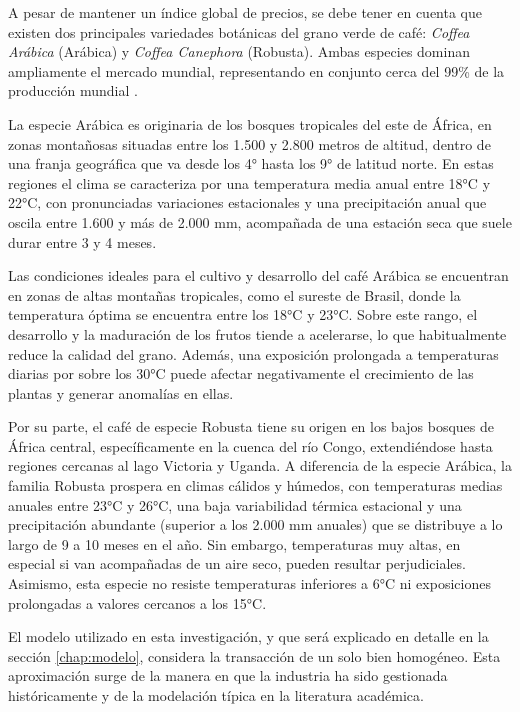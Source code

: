 A pesar de mantener un índice global de precios, se debe tener en cuenta que existen dos principales variedades botánicas del grano verde de café: \textit{Coffea Arábica} (Arábica) y \textit{Coffea Canephora} (Robusta). Ambas especies dominan ampliamente el mercado mundial, representando en conjunto cerca del 99\% de la producción mundial \citep{ICO2009ClimateCoffee}.

La especie Arábica es originaria de los bosques tropicales del este de África, en zonas montañosas situadas entre los 1.500 y 2.800 metros de altitud, dentro de una franja geográfica que va desde los 4° hasta los 9° de latitud norte. En estas regiones el clima se caracteriza por una temperatura media anual entre 18°C y 22°C, con pronunciadas variaciones estacionales y una precipitación anual que oscila entre 1.600 y más de 2.000 mm, acompañada de una estación seca que suele durar entre 3 y 4 meses.

Las condiciones ideales para el cultivo y desarrollo del café Arábica se encuentran en zonas de altas montañas tropicales, como el sureste de Brasil, donde la temperatura óptima se encuentra entre los 18°C y 23°C. Sobre este rango, el desarrollo y la maduración de los frutos tiende a acelerarse, lo que habitualmente reduce la calidad del grano. Además, una exposición prolongada a temperaturas diarias por sobre los 30°C puede afectar negativamente el crecimiento de las plantas y generar anomalías en ellas.

Por su parte, el café de especie Robusta tiene su origen en los bajos bosques de África central, específicamente en la cuenca del río Congo, extendiéndose hasta regiones cercanas al lago Victoria y Uganda. A diferencia de la especie Arábica, la familia Robusta prospera en climas cálidos y húmedos, con temperaturas medias anuales entre 23°C y 26°C, una baja variabilidad térmica estacional y una precipitación abundante (superior a los 2.000 mm anuales) que se distribuye a lo largo de 9 a 10 meses en el año. Sin embargo, temperaturas muy altas, en especial si van acompañadas de un aire seco, pueden resultar perjudiciales. Asimismo, esta especie no resiste temperaturas inferiores a 6°C ni exposiciones prolongadas a valores cercanos a los 15°C.

El modelo utilizado en esta investigación, y que será explicado en detalle en la sección \ref{chap:modelo}, considera la transacción de un solo bien homogéneo. Esta aproximación surge de la manera en que la industria ha sido gestionada históricamente y de la modelación típica en la literatura académica.

